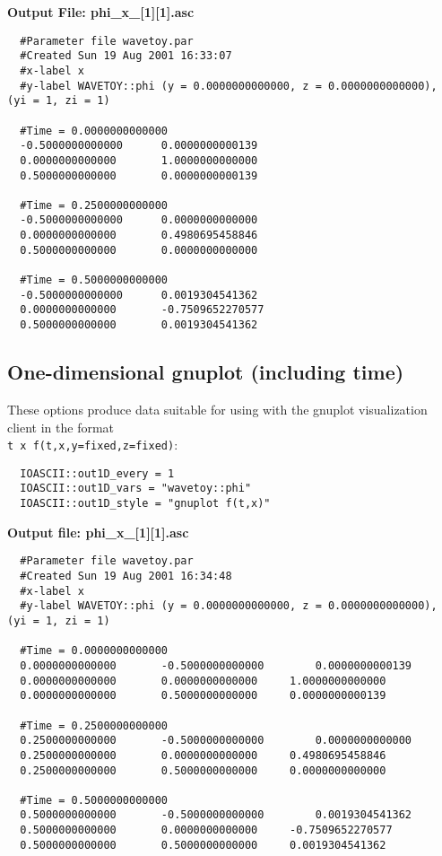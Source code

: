 \documentclass{article}
\begin{document}
\noindent
{\bf Output File: phi\_x\_[1][1].asc}

\begin{verbatim}
  #Parameter file wavetoy.par
  #Created Sun 19 Aug 2001 16:33:07
  #x-label x
  #y-label WAVETOY::phi (y = 0.0000000000000, z = 0.0000000000000), (yi = 1, zi = 1)

  #Time = 0.0000000000000
  -0.5000000000000		0.0000000000139
  0.0000000000000		1.0000000000000
  0.5000000000000		0.0000000000139

  #Time = 0.2500000000000
  -0.5000000000000		0.0000000000000
  0.0000000000000		0.4980695458846
  0.5000000000000		0.0000000000000

  #Time = 0.5000000000000
  -0.5000000000000		0.0019304541362
  0.0000000000000		-0.7509652270577
  0.5000000000000		0.0019304541362
\end{verbatim}


\subsection{One-dimensional gnuplot (including time)}

These options produce data suitable for using with the gnuplot visualization client in the format\\ {\tt t x f(t,x,y=fixed,z=fixed)}:

\begin{verbatim}
  IOASCII::out1D_every = 1
  IOASCII::out1D_vars = "wavetoy::phi"
  IOASCII::out1D_style = "gnuplot f(t,x)"
\end{verbatim}

\noindent
{\bf Output file: phi\_x\_[1][1].asc}

\begin{verbatim}
  #Parameter file wavetoy.par
  #Created Sun 19 Aug 2001 16:34:48
  #x-label x
  #y-label WAVETOY::phi (y = 0.0000000000000, z = 0.0000000000000), (yi = 1, zi = 1)

  #Time = 0.0000000000000
  0.0000000000000		-0.5000000000000		0.0000000000139
  0.0000000000000		0.0000000000000		1.0000000000000
  0.0000000000000		0.5000000000000		0.0000000000139

  #Time = 0.2500000000000
  0.2500000000000		-0.5000000000000		0.0000000000000
  0.2500000000000		0.0000000000000		0.4980695458846
  0.2500000000000		0.5000000000000		0.0000000000000

  #Time = 0.5000000000000
  0.5000000000000		-0.5000000000000		0.0019304541362
  0.5000000000000		0.0000000000000		-0.7509652270577
  0.5000000000000		0.5000000000000		0.0019304541362
\end{verbatim}
\end{document}
